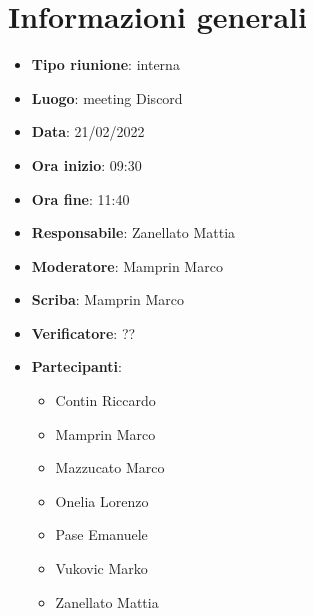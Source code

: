 \section{Informazioni generali}
\begin{itemize}
  \item \textbf{Tipo riunione}: interna
  \item \textbf{Luogo}: meeting Discord
  \item \textbf{Data}: 21/02/2022
  \item \textbf{Ora inizio}: 09:30
  \item \textbf{Ora fine}: 11:40
  \item \textbf{Responsabile}: Zanellato Mattia
  \item \textbf{Moderatore}: Mamprin Marco
  \item \textbf{Scriba}: Mamprin Marco
  \item \textbf{Verificatore}: ??
  \item \textbf{Partecipanti}:
  \begin{itemize}
    \item Contin Riccardo
    \item Mamprin Marco
    \item Mazzucato Marco
    \item Onelia Lorenzo
    \item Pase Emanuele
    \item Vukovic Marko
    \item Zanellato Mattia
  \end{itemize}
\end{itemize}
